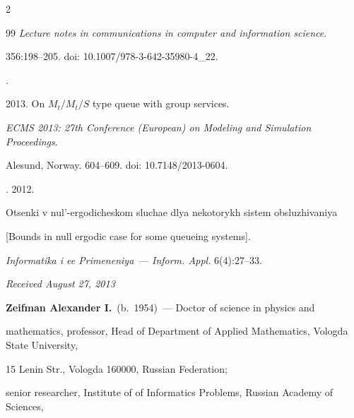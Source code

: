 \begin{multicols}{2}
{{\begin{thebibliography}{99}
\textit{Lecture notes in communications in computer and information science}. 

356:198--205. doi: 10.1007/978-3-642-35980-4\_22.


.

2013. On $M_t/M_t/S$ type queue with group services.

\textit{ECMS 2013: 27th  Conference (European) on Modeling and Simulation Proceedings}.

Alesund, Norway. 604--609. doi: 10.7148/2013-0604.


. 2012.

Otsenki v nul'-ergodicheskom slu\-chae dlya nekotorykh sistem obsluzhivaniya

[Bounds in null ergodic case for some queueing systems].

\textit{Informatika i ee Primeneniya}~--- \textit{Inform. Appl.} 6(4):27--33.



\end{thebibliography}

} }



\end{multicols}



\vspace*{-9pt}



\hfill{\small\textit{Received August 27, 2013}}



\vspace*{-20pt}



\Contr





\textbf{Zeifman Alexander I.}\ (b.\ 1954)~--- Doctor of science in physics and

mathematics, professor, Head of Department  of Applied Mathematics, Vologda State University,

15 Lenin Str., Vologda 160000, Russian Federation;

senior researcher, Institute of of Informatics Problems, Russian Academy of Sciences,

